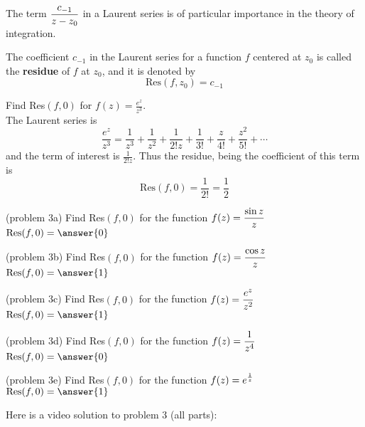 \documentclass[handout]{ximera}
\begin{document}
The term $\displaystyle \frac{c_{-1}}{z-z_0}$ in a Laurent series is of particular importance in the theory of integration.

\begin{definition}
The coefficient $c_{-1}$ in the Laurent series for a function $f$ centered at $z_0$ is called the \textbf{residue} of $f$ at $z_0$, and it is denoted by
\[
\text{Res}(f,z_0) = c_{-1}
\]
\end{definition}


\begin{example}[example 3]
Find Res$(f,0)$ for $f(z) = \frac{e^z}{z^3}$.\\
The Laurent series is
\[
\frac{e^z}{z^3} = \frac{1}{z^3} + \frac{1}{z^2} + \frac{1}{2!z} + \frac{1}{3!} + \frac{z}{4!} + \frac{z^2}{5!} + \cdots
\]
and the term of interest is $ \frac{1}{2!z}$. Thus the residue, being the coefficient of this term is
\[
\text{Res}(f,0) = \frac{1}{2!} = \frac12
\]
\end{example}

\begin{problem}(problem 3a)
Find Res$(f, 0)$ for the function $\displaystyle f(z) = \frac{\sin z}{z}$\\
$\dis \text{Res}(f,0) = \answer{0}$
\end{problem}


\begin{problem}(problem 3b)
Find Res$(f, 0)$ for the function $\displaystyle f(z) = \frac{\cos z}{z}$\\
$\dis \text{Res}(f,0) = \answer{1}$
\end{problem}


\begin{problem}(problem 3c)
Find Res$(f, 0)$ for the function $\displaystyle f(z) = \frac{e^z}{z^2}$\\
$\dis \text{Res}(f,0) = \answer{1}$
\end{problem}


\begin{problem}(problem 3d)
Find Res$(f, 0)$ for the function $\displaystyle f(z) = \frac{1}{z^4}$\\
$\dis \text{Res}(f,0) = \answer{0}$
\end{problem}


\begin{problem}(problem 3e)
Find Res$(f, 0)$ for the function $\displaystyle f(z) = e^\frac{1}{z}$\\
$\dis \text{Res}(f,0) = \answer{1}$
\end{problem}

Here is a video solution to problem 3 (all parts):\\
\begin{foldable}
\end{foldable}
\end{document}
